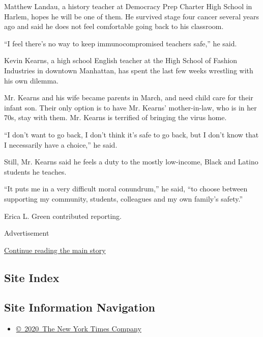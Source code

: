 Matthew Landau, a history teacher at Democracy Prep Charter High School
in Harlem, hopes he will be one of them. He survived stage four cancer
several years ago and said he does not feel comfortable going back to
his classroom.

``I feel there's no way to keep immunocompromised teachers safe,'' he
said.

Kevin Kearns, a high school English teacher at the High School of
Fashion Industries in downtown Manhattan, has spent the last few weeks
wrestling with his own dilemma.

Mr. Kearns and his wife became parents in March, and need child care for
their infant son. Their only option is to have Mr. Kearns'
mother-in-law, who is in her 70s, stay with them. Mr. Kearns is
terrified of bringing the virus home.

``I don't want to go back, I don't think it's safe to go back, but I
don't know that I necessarily have a choice,'' he said.

Still, Mr. Kearns said he feels a duty to the mostly low-income, Black
and Latino students he teaches.

``It puts me in a very difficult moral conundrum,'' he said, ``to choose
between supporting my community, students, colleagues and my own
family's safety.''

Erica L. Green contributed reporting.

Advertisement

\protect\hyperlink{after-bottom}{Continue reading the main story}

\hypertarget{site-index}{%
\subsection{Site Index}\label{site-index}}

\hypertarget{site-information-navigation}{%
\subsection{Site Information
Navigation}\label{site-information-navigation}}

\begin{itemize}
\tightlist
\item
  \href{https://help.nytimes3xbfgragh.onion/hc/en-us/articles/115014792127-Copyright-notice}{©~2020~The
  New York Times Company}
\end{itemize}

